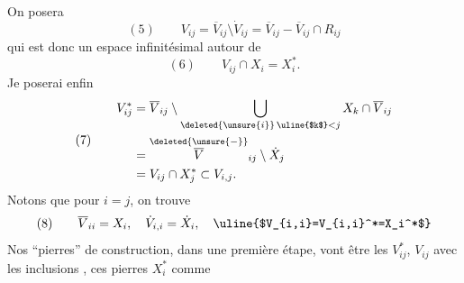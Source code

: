 On posera 
\[
(5)\qquad V_{ij}=\overline V_{ij}\setminus\dot V_{ij}=\overline V_{ij}-\overline V_{ij}\cap R_{ij}
\]
qui est donc un espace infinitésimal autour de
\[
(6)\qquad V_{ij}\cap X_i=X_i^*.
\]
Je poserai enfin
\[
(7)\qquad\begin{aligned}
V_{ij}^*&=\overline V_{ij}\setminus\bigcup_{\deleted{\unsure{i}}\,\uline{$k$}<j}X_k\cap\overline V_{ij}\\
&=\overset{\deleted{\unsure{-}}}{\overline V}_{ij}\setminus\dot X_j\\
&=V_{ij}\cap X_j^*\subset V_{i,j}.
\end{aligned}
\]
Notons que pour $i=j$, on trouve
\[
(8)\qquad\overline V_{ii}=X_i,\quad\dot V_{i,i}=\dot X_i,\quad\uline{$V_{i,i}=V_{i,i}^*=X_i^*$}
\]
Nos ``pierres'' de construction, dans une première étape, vont être les $V_{ij}^*$, $V_{ij}$ avec les inclusions 
,
ces pierres   $X_i^*$ comme
